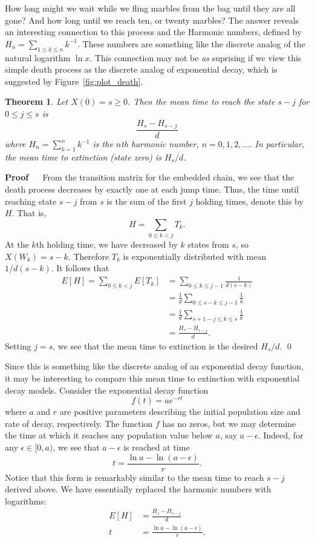 \documentclass[12pt]{article}
\renewenvironment{proof}{%
\begin{adjustwidth}{\parindent}{\parindent}
{\bf Proof} \ \ 
}{\qed
\end{adjustwidth}}
\newtheorem{thm}{Theorem}[section]
\theoremstyle{definition}
\begin{document}
How long might we wait while we fling marbles from the bag until they are all
gone? And how long until we reach ten, or twenty marbles? The answer reveals an
interesting connection to this process and the Harmonic numbers, defined by
$H_n = \sum_{1 \leq k \leq n} k^{-1}$. These numbers are something like the
discrete analog of the natural logarithm $\ln{x}$. This connection may not be
\emph{as} suprising if we view this simple death process as the discrete analog
of exponential decay, which is suggested by Figure~\ref{fig:plot_death}.

\begin{thm}
    \label{thm:mean-death-time}
    Let $X(0) = s \geq 0$. Then the mean time to reach the state $s - j$ for $0
    \leq j \leq s$ is $$\frac{H_s - H_{s - j}}{d}$$ where $H_n = \sum_{k = 1}^n
    k^{-1}$ is the $n$th harmonic number, $n = 0, 1, 2, \dots$. In particular,
    the mean time to extinction (state zero) is $H_s/d$.
\end{thm}

\begin{proof}
From the transition matrix for the embedded chain, we see that the death
process decreases by exactly one at each jump time. Thus, the time until
reaching state $s - j$ from $s$ is the sum of the first $j$ holding times,
denote this by $H$. That is, $$H = \sum_{0 \leq k < j} T_k.$$ At the $k$th
holding time, we have decreased by $k$ states from $s$, so $X(W_k) = s - k$.
Therefore $T_k$ is exponentially distributed with mean $1/d(s - k)$. It follows
that
\begin{align*}
    E[H] = \sum_{0 \leq k < j} E[T_k]
         &= \sum_{0 \leq k \leq j - 1} \frac{1}{d (s - k)} \\
         &= \frac{1}{d} \sum_{0 \leq s - k \leq j - 1} \frac{1}{k} \\
         &= \frac{1}{d} \sum_{s + 1 - j \leq k \leq s} \frac{1}{k} \\
         &= \frac{H_s - H_{s - j}}{d}.
\end{align*}
Setting $j = s$, we see that the mean time to extinction is the desired
$H_s/d$.
\end{proof}

Since this is something like the discrete analog of an exponential decay
function, it may be interesting to compare this mean time to extinction with
exponential decay models. Consider the exponential decay function $$f(t) = a
e^{-rt}$$ where $a$ and $r$ are positive parameters describing the initial
population size and rate of decay, respectively. The function $f$ has no zeros,
but we may determine the time at which it reaches any population value below
$a$, say $a - \epsilon$. Indeed, for any $\epsilon \in [0, a)$, we see that $a
- \epsilon$ is reached at time $$t = \frac{\ln{a} - \ln(a - \epsilon)}{r}.$$
Notice that this form is remarkably similar to the mean time to reach $s - j$
derived above. We have essentially replaced the harmonic numbers with
logarithms:
\begin{align*}
    E[H] &= \frac{H_s - H_{s - j}}{d} \\
    t &= \frac{\ln{a} - \ln(a - \epsilon)}{r}.
\end{align*}
\end{document}
